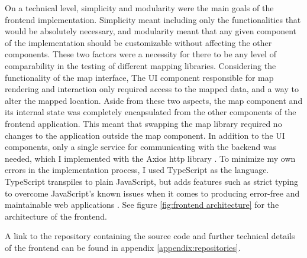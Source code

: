 On a technical level,
simplicity and modularity were the main goals of the frontend implementation.
Simplicity meant including only the functionalities that would be absolutely necessary,
and modularity meant that any given component of the implementation
should be customizable without affecting the other components.
These two factors were a necessity for there to be
any level of comparability in the testing of different mapping libraries.
Considering the functionality of the map interface,
The UI component responsible for map rendering and interaction
only required access to the mapped data,
and a way to alter the mapped location.
Aside from these two aspects,
the map component and its internal state was completely encapsulated
from the other components of the frontend application.
This meant that swapping the map library
required no changes to the application outside the map component.
In addition to the UI components,
only a single service for communicating with the backend was needed,
which I implemented with the Axios \acrshort{http} library \parencite{axios}.
To minimize my own errors in the implementation process,
I used TypeScript \parencite{typescript} as the language.
TypeScript transpiles to plain JavaScript,
but adds features such as strict typing to overcome JavaScript's known issues
when it comes to producing error-free and maintainable web applications \parencite{bie2014}.
See figure \ref{fig:frontend architecture} for the architecture of the frontend.

A link to the repository containing the source code
and further technical details of the frontend
can be found in appendix \ref{appendix:repositories}.

